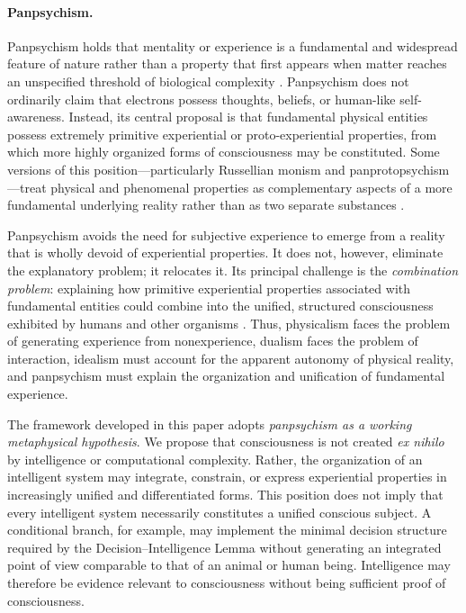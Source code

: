 \paragraph{Panpsychism.}
Panpsychism holds that mentality or experience is a fundamental and widespread
feature of nature rather than a property that first appears when matter reaches an
unspecified threshold of biological complexity
\cite{strawson2006realistic,goff2017consciousness,chalmers2015panpsychism}.
Panpsychism does not ordinarily claim that electrons possess thoughts, beliefs, or
human-like self-awareness. Instead, its central proposal is that fundamental
physical entities possess extremely primitive experiential or proto-experiential
properties, from which more highly organized forms of consciousness may be
constituted. Some versions of this position---particularly Russellian monism and
panprotopsychism---treat physical and phenomenal properties as complementary
aspects of a more fundamental underlying reality rather than as two separate
substances \cite{russell1927analysis,chalmers2015panpsychism}.
\par
Panpsychism avoids the need for subjective experience to emerge from a reality that
is wholly devoid of experiential properties. It does not, however, eliminate the
explanatory problem; it relocates it. Its principal challenge is the
\emph{combination problem}: explaining how primitive experiential properties
associated with fundamental entities could combine into the unified, structured
consciousness exhibited by humans and other organisms
\cite{seager1995consciousness,chalmers2017combination}. Thus, physicalism faces
the problem of generating experience from nonexperience, dualism faces the problem
of interaction, idealism must account for the apparent autonomy of physical
reality, and panpsychism must explain the organization and unification of
fundamental experience.

The framework developed in this paper adopts \emph{panpsychism as a working
metaphysical hypothesis}. We propose that consciousness is not created \emph{ex
nihilo} by intelligence or computational complexity. Rather, the organization of
an intelligent system may integrate, constrain, or express experiential
properties in increasingly unified and differentiated forms. This position does
not imply that every intelligent system necessarily constitutes a unified
conscious subject. A conditional branch, for example, may implement the minimal
decision structure required by the Decision--Intelligence Lemma without generating
an integrated point of view comparable to that of an animal or human being.
Intelligence may therefore be evidence relevant to consciousness without being
sufficient proof of consciousness.

